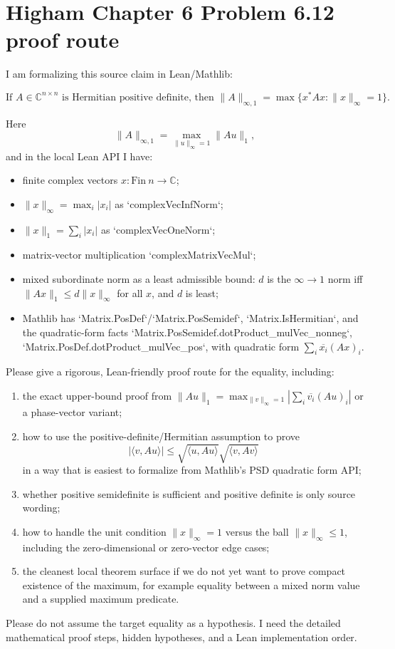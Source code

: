 \documentclass{article}
\begin{document}
\section*{Higham Chapter 6 Problem 6.12 proof route}

I am formalizing this source claim in Lean/Mathlib:

\[
\text{If }A\in\mathbb C^{n\times n}\text{ is Hermitian positive definite, then }
\|A\|_{\infty,1}
= \max\{x^* A x : \|x\|_\infty = 1\}.
\]

Here
\[
\|A\|_{\infty,1}=\max_{\|u\|_\infty=1}\|Au\|_1,
\]
and in the local Lean API I have:

\begin{itemize}
\item finite complex vectors \(x:\mathrm{Fin}\ n\to\mathbb C\);
\item \( \|x\|_\infty=\max_i |x_i|\) as `complexVecInfNorm`;
\item \( \|x\|_1=\sum_i |x_i|\) as `complexVecOneNorm`;
\item matrix-vector multiplication `complexMatrixVecMul`;
\item mixed subordinate norm as a least admissible bound:
  \(d\) is the \(\infty\to 1\) norm iff
  \(\|A x\|_1\le d\|x\|_\infty\) for all \(x\), and \(d\) is least;
\item Mathlib has `Matrix.PosDef`/`Matrix.PosSemidef`, `Matrix.IsHermitian`,
  and the quadratic-form facts
  `Matrix.PosSemidef.dotProduct_mulVec_nonneg`,
  `Matrix.PosDef.dotProduct_mulVec_pos`,
  with quadratic form
  \(\sum_i \overline{x_i}(Ax)_i\).
\end{itemize}

Please give a rigorous, Lean-friendly proof route for the equality, including:

\begin{enumerate}
\item the exact upper-bound proof from
  \(\|A u\|_1 = \max_{\|v\|_\infty=1} |\sum_i \overline{v_i}(Au)_i|\)
  or a phase-vector variant;
\item how to use the positive-definite/Hermitian assumption to prove
  \[
  |\langle v,Au\rangle| \le
  \sqrt{\langle u,Au\rangle}\sqrt{\langle v,Av\rangle}
  \]
  in a way that is easiest to formalize from Mathlib's PSD quadratic form API;
\item whether positive semidefinite is sufficient and positive definite is only
  source wording;
\item how to handle the unit condition \(\|x\|_\infty=1\) versus the ball
  \(\|x\|_\infty\le 1\), including the zero-dimensional or zero-vector edge
  cases;
\item the cleanest local theorem surface if we do not yet want to prove
  compact existence of the maximum, for example equality between a mixed norm
  value and a supplied maximum predicate.
\end{enumerate}

Please do not assume the target equality as a hypothesis. I need the detailed
mathematical proof steps, hidden hypotheses, and a Lean implementation order.
\end{document}
